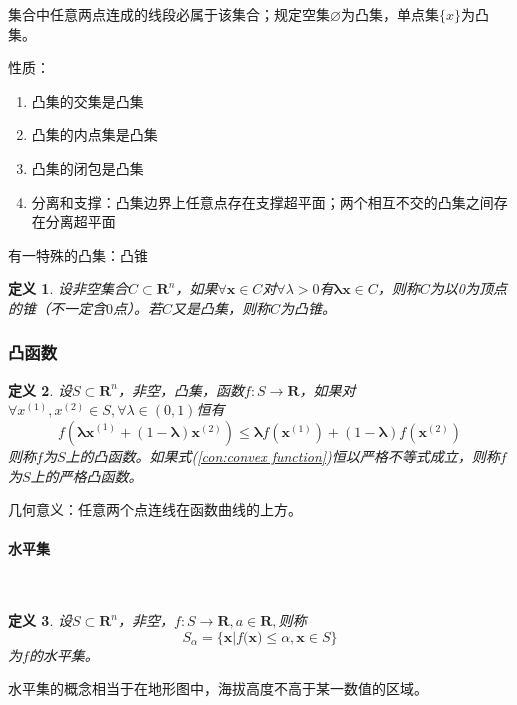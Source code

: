 \documentclass{book}
\newtheorem{definition}{\indent 定义}[chapter]
\newcommand{\subsubsubsection}[1]{\paragraph{#1}\mbox{}\\}
\begin{document}
集合中任意两点连成的线段必属于该集合；规定空集$\varnothing$为凸集，单点集$\{x\}$为凸集。

性质：
\begin{enumerate}
    \item 凸集的交集是凸集
    \item 凸集的内点集是凸集
    \item 凸集的闭包是凸集
    \item 分离和支撑：凸集边界上任意点存在支撑超平面；两个相互不交的凸集之间存在分离超平面
\end{enumerate}

有一特殊的凸集：凸锥

\begin{definition}
    设非空集合$C\subset\mathbf{R}^n$，如果$\forall\boldsymbol{x}\in C$对$\forall\lambda>0$有$\boldsymbol{\lambda x} \in C$，则称$C$为以0为顶点的锥（不一定含$0$点）。若$C$又是凸集，则称$C$为凸锥。
\end{definition}

\subsubsection{凸函数}
\begin{definition}
    设$S\subset \mathbf{R}^n$，非空，凸集，函数$f:S\rightarrow \mathbf{R}$，如果对$\forall x^{(1)}, x^{(2)}\in S, \forall\lambda\in (0,1)$恒有
    \begin{equation}
        f(\boldsymbol{\lambda x}^{(1)}+(1-\boldsymbol{\lambda})\boldsymbol{x}^{(2)})\le\boldsymbol{\lambda}f(\boldsymbol{x}^{(1)})+(1-\boldsymbol{\lambda})f(\boldsymbol{x}^{(2)})
        \label{con:convex function}
    \end{equation}
    则称$f$为$S$上的凸函数。如果式(\ref{con:convex function})恒以严格不等式成立，则称$f$为$S$上的严格凸函数。
\end{definition}

几何意义：任意两个点连线在函数曲线的上方。

\subsubsubsection{水平集}
\begin{definition}
    设$S\subset\mathbf{R}^n$，非空，$f:S\rightarrow\mathbf{R}, a\in \mathbf{R},$则称
    \begin{equation}
        S_{\alpha}=\{\boldsymbol{x}|f(\boldsymbol{x)}\le\alpha,\boldsymbol{x}\in S\}
        \label{con:level set}
    \end{equation}
    为$f$的水平集。
\end{definition}

水平集的概念相当于在地形图中，海拔高度不高于某一数值的区域。
\end{document}
